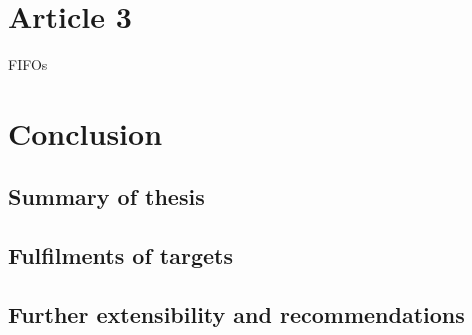 \chapter{Article 3} 
\lipsum 
\glspl{FIFO}




\chapter{Conclusion}
\section{Summary of thesis} \lipsum
\section{Fulfilments of targets} \lipsum
\section{Further extensibility and recommendations} \lipsum
